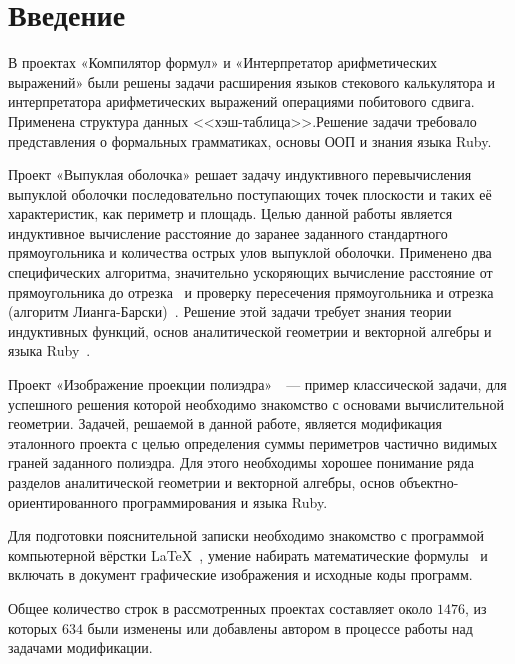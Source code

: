 \section{Введение}

В проектах «Компилятор формул» и «Интерпретатор арифметических
выражений» были решены задачи расширения языков стекового калькулятора
и интерпретатора арифметических выражений операциями побитового сдвига.
Применена структура данных <<хэш-таблица>>.Решение задачи требовало представления
о формальных грамматиках, основы ООП и знания языка Ruby.

Проект «Выпуклая оболочка»\cite{convex} решает задачу индуктивного перевычисления выпуклой оболочки последовательно поступающих точек плоскости и таких её характеристик, как периметр и площадь. Целью данной работы является
индуктивное вычисление расстояние до заранее заданного стандартного прямоугольника
и количества острых улов выпуклой оболочки. Применено два специфических алгоритма,
значительно ускоряющих вычисление расстояние от прямоугольника до
отрезка~\cite{seginters} и проверку пересечения прямоугольника и
отрезка (алгоритм Лианга-Барски)~\cite{barsky}. Решение этой задачи требует знания
теории индуктивных функций, основ аналитической геометрии и векторной алгебры
и языка Ruby~\cite{ruby}.

Проект «Изображение проекции полиэдра»~\cite{polyedr}~--- пример
классической задачи, для успешного решения которой необходимо знакомство с
основами вычислительной геометрии. Задачей, решаемой в данной работе, является
модификация эталонного проекта с целью определения суммы периметров частично видимых граней заданного полиэдра. Для этого необходимы хорошее понимание ряда разделов аналитической геометрии и векторной алгебры, основ объектно-ориентированного программирования и языка Ruby.

Для подготовки пояснительной записки необходимо знакомство с программой компьютерной вёрстки \LaTeX~\cite{rlatex}, умение набирать математические формулы~\cite{texbook} и включать в документ графические изображения и исходные
коды программ.

Общее количество строк в рассмотренных проектах составляет около $1476$, из которых $634$ были изменены или добавлены автором в процессе работы над задачами модификации.
